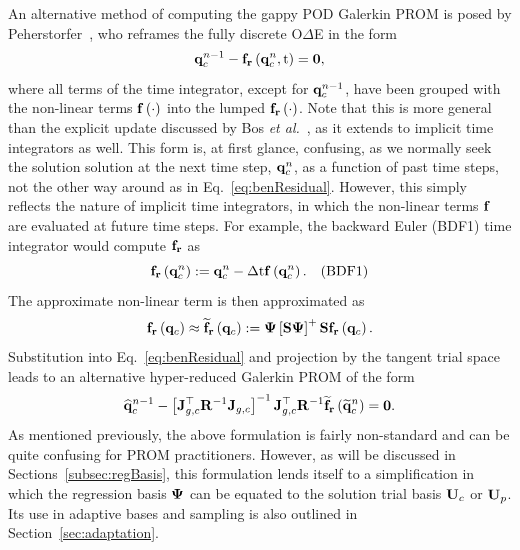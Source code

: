 An alternative method of computing the gappy POD Galerkin PROM is posed by Peherstorfer~\cite{Peherstorfer2020Adaptive}, who reframes the fully discrete O$\Delta$E in the form
%
\begin{equation}\label{eq:benResidual}
	\mathbf{q}_{c}^{n-1} - \mathbf{f}_{\mathbf{r}}\left(\mathbf{q}_{c}^{n}, \text{t}\right) = \mathbf{0},
\end{equation}
%
where all terms of the time integrator, except for $\mathbf{q}_{c}^{n - 1}$, have been grouped with the non-linear terms $\mathbf{f} \left(\cdot\right)$ into the lumped $\mathbf{f}_{\mathbf{r}}\left(\cdot\right)$. Note that this is more general than the explicit update discussed by Bos \textit{et al.}~\cite{Bos2004}, as it extends to implicit time integrators as well. This form is, at first glance, confusing, as we normally seek the solution solution at the next time step, $\mathbf{q}_{c}^{n}$, as a function of past time steps, not the other way around as in Eq.~\ref{eq:benResidual}. However, this simply reflects the nature of implicit time integrators, in which the non-linear terms $\mathbf{f}$ are evaluated at future time steps. For example, the backward Euler (BDF1) time integrator would compute $\mathbf{f}_{\mathbf{r}}$ as
%
\begin{equation}
	\mathbf{f}_{\mathbf{r}}\left(\mathbf{q}_{c}^{n}\right) := \mathbf{q}_{c}^{n} - \Delta \text{t} \mathbf{f} \left(\mathbf{q}_{c}^{n}\right). \quad \text{(BDF1)}
\end{equation}
%
The approximate non-linear term is then approximated as
%
\begin{equation}
	\rhsResFunc{\consVec} \approx \rhsResApproxFunc{\consVec} \defEq \deimBasis \left[\sampMat \deimBasis \right]^+ \sampMat \rhsResFunc{\consVec}.
\end{equation}
%
Substitution into Eq.~\ref{eq:benResidual} and projection by the tangent trial space leads to an alternative hyper-reduced Galerkin PROM of the form
%
\begin{equation}
    \consVecCoef^{\timeIdx-1} - \left[\jacobDecodeCons^\top \resScaleInv \jacobDecodeCons\right]^{-1} \jacobDecodeCons^\top \resScaleInv \rhsResApproxFunc{\consVecRom^{\timeIdx}} = \zeroVec.
\end{equation}
%
As mentioned previously, the above formulation is fairly non-standard and can be quite confusing for PROM practitioners. However, as will be discussed in Sections~\ref{subsec:regBasis}, this formulation lends itself to a simplification in which the regression basis $\deimBasis$ can be equated to the solution trial basis $\consTrial$ or $\primTrial$. Its use in adaptive bases and sampling is also outlined in Section~\ref{sec:adaptation}.

